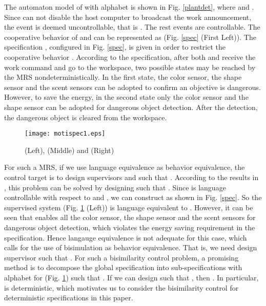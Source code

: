 \documentclass[preprint,authoryear,12pt]{elsarticle}
\begin{document}
The automaton model  of  with alphabet  is
shown in Fig. \ref{plantdet}, where  and . Since  can
not disable the host computer to broadcast the work announcement,
the event  is deemed uncontrollable, that is . The rest events are controllable. The cooperative
behavior of  and  can be represented as  (Fig.
\ref{spec} (First Left)). The specification , configured in
Fig. \ref{spec}, is given in order to restrict the cooperative
behavior . According to the specification, after both
 and  receive the work command and go to the workspace,
two possible states may be reached by the MRS
nondeterministically. In the first state, the color sensor, the
shape sensor and the scent sensors can be adopted to confirm an
objective is dangerous. However, to save the energy, in the second
state only the color sensor and the shape sensor can be adopted
for dangerous object detection. After the detection, the dangerous
object is cleared from the workspace.





\begin{figure}[!htb]
\begin{center}
\texttt{[image: motispec1.eps]}
\caption{ (Left),  (Middle)
and  (Right)} \label{proj}
\end{center}
\end{figure}


For such a MRS, if we use language equivalence as behavior
equivalence, the control target is to design supervisors  and
 such that .
According to the results in \citep{willner1991supervisory}, this
problem can be solved by designing  such that
. Since  is language controllable with respect to
 and , we can construct  as shown in
Fig. \ref{spec}. So the supervised system  (Fig. \ref{proj} (Left)) is language equivalent to
. However, it can be seen that 
enables all the color sensor, the shape sensor and the scent
sensors for dangerous object detection, which violates the energy
saving requirement in the specification. Hence langauge
equivalence is not adequate for this case, which calls for the use
of bisimulation as behavior equivalence. That is, we need design
supervisor  such that . For such a bisimilarity control problem, a promising method
\citep{karimadini2011guaranteed} is to decompose the global
specification  into sub-specifications  with alphabet
 for  (Fig. \ref{proj}) such that  . If we can design  such that , then . In
particular,  is deterministic, which motivates us to
consider the bisimilarity control for deterministic specifications
in this paper.
\end{document}
